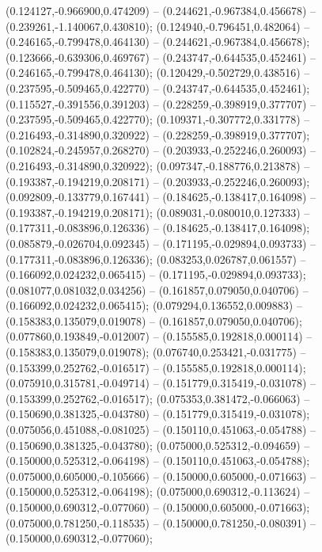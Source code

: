  (0.124127,-0.966900,0.474209) -- (0.244621,-0.967384,0.456678) -- (0.239261,-1.140067,0.430810);
 (0.124940,-0.796451,0.482064) -- (0.246165,-0.799478,0.464130) -- (0.244621,-0.967384,0.456678);
 (0.123666,-0.639306,0.469767) -- (0.243747,-0.644535,0.452461) -- (0.246165,-0.799478,0.464130);
 (0.120429,-0.502729,0.438516) -- (0.237595,-0.509465,0.422770) -- (0.243747,-0.644535,0.452461);
 (0.115527,-0.391556,0.391203) -- (0.228259,-0.398919,0.377707) -- (0.237595,-0.509465,0.422770);
 (0.109371,-0.307772,0.331778) -- (0.216493,-0.314890,0.320922) -- (0.228259,-0.398919,0.377707);
 (0.102824,-0.245957,0.268270) -- (0.203933,-0.252246,0.260093) -- (0.216493,-0.314890,0.320922);
 (0.097347,-0.188776,0.213878) -- (0.193387,-0.194219,0.208171) -- (0.203933,-0.252246,0.260093);
 (0.092809,-0.133779,0.167441) -- (0.184625,-0.138417,0.164098) -- (0.193387,-0.194219,0.208171);
 (0.089031,-0.080010,0.127333) -- (0.177311,-0.083896,0.126336) -- (0.184625,-0.138417,0.164098);
 (0.085879,-0.026704,0.092345) -- (0.171195,-0.029894,0.093733) -- (0.177311,-0.083896,0.126336);
 (0.083253,0.026787,0.061557) -- (0.166092,0.024232,0.065415) -- (0.171195,-0.029894,0.093733);
 (0.081077,0.081032,0.034256) -- (0.161857,0.079050,0.040706) -- (0.166092,0.024232,0.065415);
 (0.079294,0.136552,0.009883) -- (0.158383,0.135079,0.019078) -- (0.161857,0.079050,0.040706);
 (0.077860,0.193849,-0.012007) -- (0.155585,0.192818,0.000114) -- (0.158383,0.135079,0.019078);
 (0.076740,0.253421,-0.031775) -- (0.153399,0.252762,-0.016517) -- (0.155585,0.192818,0.000114);
 (0.075910,0.315781,-0.049714) -- (0.151779,0.315419,-0.031078) -- (0.153399,0.252762,-0.016517);
 (0.075353,0.381472,-0.066063) -- (0.150690,0.381325,-0.043780) -- (0.151779,0.315419,-0.031078);
 (0.075056,0.451088,-0.081025) -- (0.150110,0.451063,-0.054788) -- (0.150690,0.381325,-0.043780);
 (0.075000,0.525312,-0.094659) -- (0.150000,0.525312,-0.064198) -- (0.150110,0.451063,-0.054788);
 (0.075000,0.605000,-0.105666) -- (0.150000,0.605000,-0.071663) -- (0.150000,0.525312,-0.064198);
 (0.075000,0.690312,-0.113624) -- (0.150000,0.690312,-0.077060) -- (0.150000,0.605000,-0.071663);
 (0.075000,0.781250,-0.118535) -- (0.150000,0.781250,-0.080391) -- (0.150000,0.690312,-0.077060);
